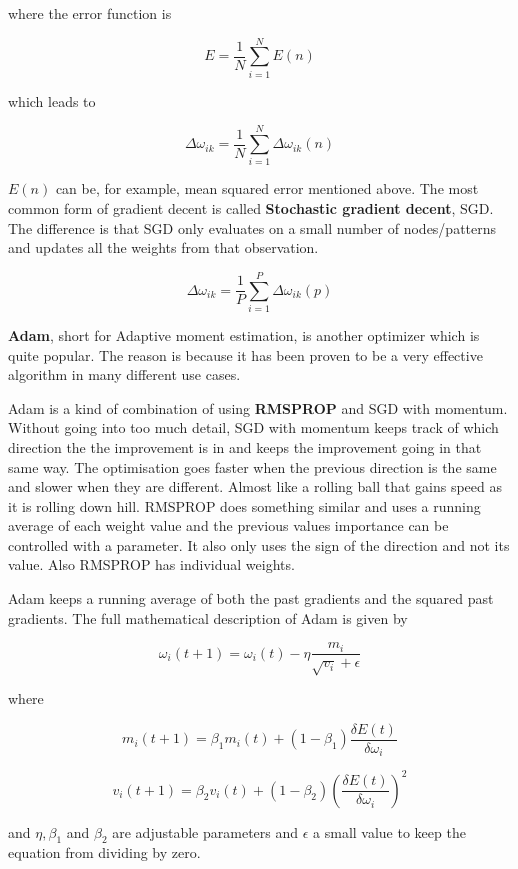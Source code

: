 \begin{center}
where the error function is
\end{center}

\[E = \frac{1}{N} \displaystyle\sum_{i=1}^{N} E(n) \]

\begin{center}
which leads to
\end{center}

\[ \Delta\omega_{ik} = \frac{1}{N}  \displaystyle\sum_{i=1}^{N} \Delta\omega_{ik}(n) \]

$ E(n) $ can be, for example, mean squared error mentioned above.
The most common form of gradient decent is called \textbf{Stochastic gradient decent}, SGD.
The difference is that SGD only evaluates on a small number of nodes/patterns and updates all the weights from that observation.

\[ \Delta\omega_{ik} = \frac{1}{P}  \displaystyle\sum_{i=1}^{P} \Delta\omega_{ik}(p) \]

\textbf{Adam}, short for Adaptive moment estimation, is another optimizer which is quite popular.
The reason is because it has been proven to be a very effective algorithm in many different use cases.

Adam is a kind of combination of using \textbf{RMSPROP} and SGD with momentum.
Without going into too much detail, SGD with momentum keeps track of which direction the the improvement is in and keeps the improvement going in that same way. The optimisation goes faster when the previous direction is the same and slower when they are different. Almost like a rolling ball that gains speed as it is rolling down hill.
RMSPROP does something similar and uses a running average of each weight value and the previous values importance can be controlled with a parameter. It also only uses the sign of the direction and not its value. Also RMSPROP has individual weights.

Adam keeps a running average of both the past gradients and the squared past gradients.
The full mathematical description of Adam is given by

\[ \omega_i (t+1) = \omega_i(t) - \eta \frac{m_i}{\sqrt{v_i} + \epsilon} \]

where

\[ m_i (t+1) = \beta_1m_i(t) + (1 - \beta_1) \frac{ \delta E(t) }{\delta\omega_i} \]

\[ v_i (t+1) = \beta_2v_i(t) + (1 - \beta_2) (\frac{ \delta E(t) }{\delta\omega_i})^2 \]

and $ \eta, \beta_1 $ and $ \beta_2 $ are adjustable parameters and $ \epsilon $ a small value to keep the equation from dividing by zero.\\

